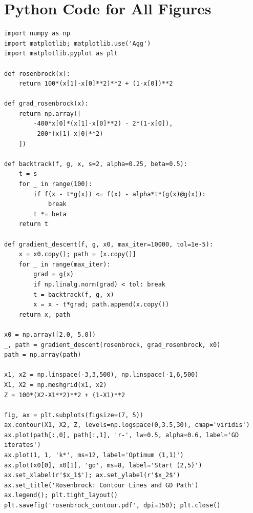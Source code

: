 \documentclass[11pt]{article}
\theoremstyle{definition}
\theoremstyle{plain}
\begin{document}
\section{Python Code for All Figures}

\begin{Verbatim}[fontsize=\small, label=Listing 1: Rosenbrock contour + GD iterates,
                  frame=single, labelposition=topline]
import numpy as np
import matplotlib; matplotlib.use('Agg')
import matplotlib.pyplot as plt

def rosenbrock(x):
    return 100*(x[1]-x[0]**2)**2 + (1-x[0])**2

def grad_rosenbrock(x):
    return np.array([
        -400*x[0]*(x[1]-x[0]**2) - 2*(1-x[0]),
         200*(x[1]-x[0]**2)
    ])

def backtrack(f, g, x, s=2, alpha=0.25, beta=0.5):
    t = s
    for _ in range(100):
        if f(x - t*g(x)) <= f(x) - alpha*t*(g(x)@g(x)):
            break
        t *= beta
    return t

def gradient_descent(f, g, x0, max_iter=10000, tol=1e-5):
    x = x0.copy(); path = [x.copy()]
    for _ in range(max_iter):
        grad = g(x)
        if np.linalg.norm(grad) < tol: break
        t = backtrack(f, g, x)
        x = x - t*grad; path.append(x.copy())
    return x, path

x0 = np.array([2.0, 5.0])
_, path = gradient_descent(rosenbrock, grad_rosenbrock, x0)
path = np.array(path)

x1, x2 = np.linspace(-3,3,500), np.linspace(-1,6,500)
X1, X2 = np.meshgrid(x1, x2)
Z = 100*(X2-X1**2)**2 + (1-X1)**2

fig, ax = plt.subplots(figsize=(7, 5))
ax.contour(X1, X2, Z, levels=np.logspace(0,3.5,30), cmap='viridis')
ax.plot(path[:,0], path[:,1], 'r-', lw=0.5, alpha=0.6, label='GD iterates')
ax.plot(1, 1, 'k*', ms=12, label='Optimum (1,1)')
ax.plot(x0[0], x0[1], 'go', ms=8, label='Start (2,5)')
ax.set_xlabel(r'$x_1$'); ax.set_ylabel(r'$x_2$')
ax.set_title('Rosenbrock: Contour Lines and GD Path')
ax.legend(); plt.tight_layout()
plt.savefig('rosenbrock_contour.pdf', dpi=150); plt.close()
\end{Verbatim}
\end{document}
